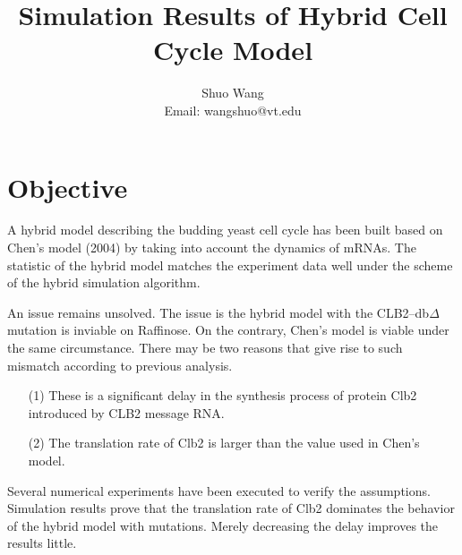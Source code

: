 \documentclass[12pt]{article}
\title{Simulation Results of Hybrid Cell Cycle Model}
\author{
 Shuo Wang\\
\small {Email: wangshuo@vt.edu}
}
\begin{document}
\maketitle
\section{Objective}
A hybrid model describing the budding yeast cell cycle has been built based on
Chen's model (2004) by taking into account the dynamics of mRNAs.
The statistic of the hybrid model matches the experiment 
data well under the scheme of the hybrid simulation algorithm. 

An issue remains unsolved. The issue is the hybrid model with the CLB2--db$\Delta$
mutation is inviable on Raffinose. 
On the contrary, Chen's model is viable under the same circumstance. 
There may be two reasons that give rise to such mismatch according to previous analysis. 
\begin{itemize}
  \item[(1)] These is a significant delay in the synthesis process of protein Clb2 introduced by CLB2 message RNA.
  \item[(2)] The translation rate of Clb2 is larger than the value used in Chen's model.
\end{itemize}

Several numerical experiments have been executed to verify the assumptions. 
Simulation results prove that the translation rate of Clb2 dominates the behavior of 
the hybrid model with mutations. Merely decreasing the delay improves the results little. 
\end{document}
